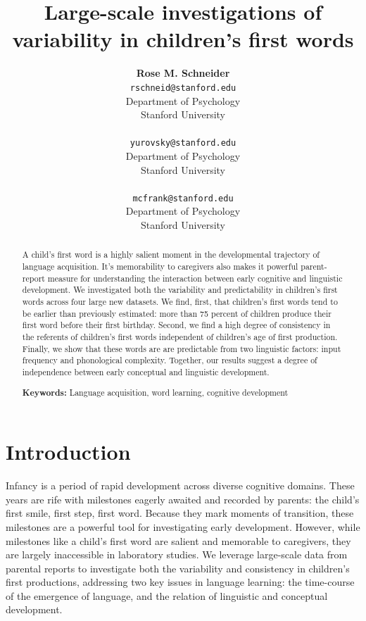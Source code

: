 \documentclass[10pt,letterpaper]{article}
\title{Large-scale investigations of variability in children's first words}
\author{{\large \bf Rose M. Schneider} \\ \texttt{rschneid@stanford.edu}\\ Department of Psychology \\ Stanford University \\ 
\And {\large \bf Daniel Yurovsky} \\ \texttt{yurovsky@stanford.edu} \\ Department of Psychology \\ Stanford University \\ 
\And {\large \bf Michael C. Frank} \\ \texttt{mcfrank@stanford.edu} \\ Department of Psychology \\ Stanford University \\ }
\begin{document}
\maketitle


\begin{abstract}
A child's first word is a highly salient moment in the developmental trajectory of language acquisition. It's memorability to caregivers also makes it powerful parent-report measure for understanding the interaction between early cognitive and linguistic development. We investigated both the variability and predictability in children's first words across four large new datasets. We find, first, that children's first words tend to be earlier than previously estimated: more than 75 percent of children produce their first word before their first birthday. Second, we find a high degree of consistency in the referents of children's first words independent of children's age of first production. Finally, we show that these words are are predictable from two linguistic factors: input frequency and phonological complexity. Together, our results suggest a degree of independence between early conceptual and linguistic development.

\textbf{Keywords:}
Language acquisition, word learning, cognitive development
\end{abstract}

\section{Introduction}

Infancy is a period of rapid development across diverse cognitive domains. These years are rife with milestones eagerly awaited and recorded by parents: the child's first smile, first step, first word. Because they mark moments of transition, these milestones are a powerful tool for investigating early development. However, while milestones like a child's first word are salient and memorable to caregivers, they are largely inaccessible in laboratory studies. We leverage large-scale data from parental reports to investigate both the variability and consistency in children's first productions, addressing two key issues in language learning: the time-course of the emergence of language, and the relation of linguistic and conceptual development. 
\end{document}

